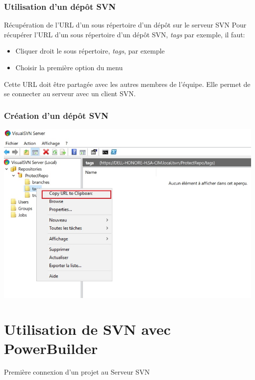 \documentclass{beamer}
\begin{document}
\begin{frame}[label={svnCheckout}]
\frametitle{Utilisation d'un dépôt SVN}
\begin{block}{Récupération de l'URL d'un sous répertoire d'un dépôt sur le serveur SVN}
Pour récupérer l'URL d'un sous répertoire d'un dépôt SVN, \alert{\textit{tags}} par exemple, il faut:
\begin{itemize}
\item Cliquer droit le sous répertoire, \alert{\textit{tags}}, par exemple
\item Choisir la première option du menu
\end{itemize}
\alert{Cette URL doit être partagée avec les autres membres de l'équipe. Elle permet de se connecter au serveur avec un client SVN.}
\end{block}
\end{frame}

\begin{frame}
\frametitle{Création d'un dépôt SVN}
\includegraphics[scale=.5]{../images/server16.jpg}
\end{frame}
\section{Utilisation de SVN avec PowerBuilder}


\begin{frame}
\begin{center}
\huge{Première connexion d'un projet au Serveur SVN}
\end{center}
\end{frame}
\end{document}
